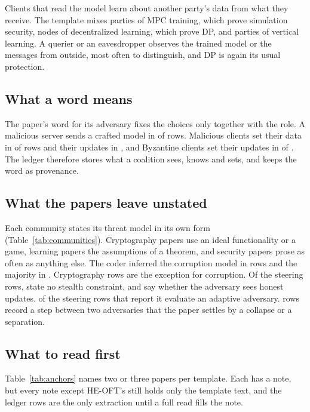 \documentclass{labreport}
\newcommand{\T}[1]{}
\begin{document}
Clients that read the model learn about another party's data from what they
receive. The template mixes parties of MPC training, which prove simulation
security, nodes of decentralized learning, which prove DP, and parties of
vertical learning. A querier or an eavesdropper observes the trained model or
the messages from outside, most often to distinguish, and DP is again its
usual protection.

\T{templates}
\T{support}

\subsection*{What a word means}
The paper's word for its adversary fixes the choices only together with the
role. A malicious server sends a crafted model in  of
 rows. Malicious clients set their data in 
of  rows and their updates in , and
Byzantine clients set their updates in  of . The ledger
therefore stores what a coalition sees, knows and sets, and keeps the word as
provenance.

\subsection*{What the papers leave unstated}
Each community states its threat model in its own form
(Table~\ref{tab:communities}). Cryptography papers use an ideal functionality or
a game, learning papers the assumptions of a theorem, and security papers prose
as often as anything else. The coder inferred the corruption model in
 rows and the majority in . Cryptography
rows are the exception for corruption. Of the  steering rows,
 state no stealth constraint, and  say
whether the adversary sees honest updates.  of the
 steering rows that report it evaluate an adaptive adversary.
 rows record a step between two adversaries that the paper settles by
a collapse or a separation.

\T{communities}

\subsection*{What to read first}
Table~\ref{tab:anchors} names two or three papers per template. Each has a note,
but every note except HE-OFT's still holds only the template text, and the
ledger rows are the only extraction until a full read fills the note.

\T{anchors}
\end{document}
